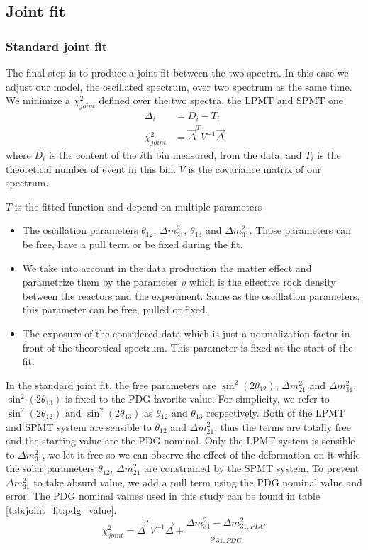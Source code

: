 \documentclass[../main.tex]{subfiles}
\begin{document}
\subsection{Joint fit}

\subsubsection{Standard joint fit}

The final step is to produce a joint fit between the two spectra. In this case we adjust our model, the oscillated spectrum, over two spectrum as the same time. We minimize a $\chi^2_{joint}$ defined over the two spectra, the LPMT and SPMT one
\begin{align}
  \label{eq:joint_fit:pearson}
  \Delta_i &= D_{i} - T_{i} \\
  \chi^2_{joint} &= \vec{\Delta}^T V^{-1} \vec{\Delta}
\end{align}
where $D_{i}$ is the content of the $i$th bin measured, from the data, and $T_{i}$ is the theoretical number of event in this bin. $V$ is the covariance matrix of our spectrum.

$T$ is the fitted function and depend on multiple parameters
\begin{itemize}
  \item The oscillation parameters $\theta_{12}$, $\Delta m^2_{21}$, $\theta_{13}$ and $\Delta m^2_{31}$. Those parameters can be free, have a pull term or be fixed during the fit.
  \item We take into account in the data production the matter effect and parametrize them by the parameter $\rho$ which is the effective rock density between the reactors and the experiment. Same as the oscillation parameters, this parameter can be free, pulled or fixed.
  \item The exposure of the considered data which is just a normalization factor in front of the theoretical spectrum. This parameter is fixed at the start of the fit.
\end{itemize}

In the standard joint fit, the free parameters are $\sin^2(2\theta_{12})$, $\Delta m^2_{21}$ and $\Delta m^2_{31}$. $\sin^2(2\theta_{13})$ is fixed to the PDG favorite value. For simplicity, we refer to $\sin^2(2\theta_{12})$ and $\sin^2(2\theta_{13})$ as $\theta_{12}$ and $\theta_{13}$ respectively. Both of the LPMT and SPMT system are sensible to $\theta_{12}$ and $\Delta m^2_{21}$, thus the terms are totally free and the starting value are the PDG nominal. Only the LPMT system is sensible to $\Delta m^2_{31}$, we let it free so we can observe the effect of the deformation on it while the solar parameters $\theta_{12}$, $\Delta m^2_{21}$ are constrained by the SPMT system. To prevent $\Delta m^2_{31}$ to take absurd value, we add a pull term using the PDG nominal value and error. The PDG nominal values used in this study can be found in table \ref{tab:joint_fit:pdg_value}.
\begin{equation}
  \chi^2_{joint} = \vec{\Delta}^T V^{-1} \vec{\Delta} + \frac{\Delta m^2_{31} - \Delta m^2_{31,PDG}}{\sigma_{31, PDG}}
\end{equation}
\end{document}
